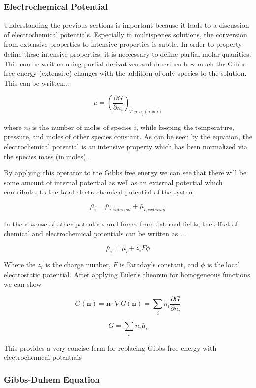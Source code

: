 \documentclass[lettersize,journal]{IEEEtran}
\begin{document}
 \subsubsection{Electrochemical Potential}

 Understanding the previous sections is important because it leads to a discussion of electrochemical potentials. Especially in multispecies solutions, the conversion from extensive properties to intensive properties is subtle. In order to property define these intensive properties, it is neccessary to define partial molar quanities. This can be written using partial derivatives and describes how much the Gibbs free energy (extensive) changes with the addition of only species to the solution. This can be written...

 \[
    \bar{\mu} = \left( \frac{\partial G}{\partial n_{i}} \right)_{T,p,n_{j} (j \neq i)}
 \]

 where $n_i$ is the number of moles of species $i$, while keeping the temperature, pressure, and moles of other species constant. As can be seen by the equation, the electrochemical potential is an intensive property which has been normalized via the species mass (in moles).

 By applying this operator to the Gibbs free energy we can see that there will be some amount of internal potential as well as an external potential which contributes to the total electrochemical potential of the system.

\[
    \bar{\mu_{i}} = \bar{\mu}_{i, internal} + \bar{\mu}_{i, external}
\]

 In the absense of other potentials and forces from external fields, the effect of chemical and electrochemical potentials can be written as ...

 \[
    \bar{\mu}_{i} = \mu_{i} + z_i F \phi
 \]


Where the $z_i$ is the charge number, $F$ is Faraday's constant, and $\phi$ is the local electrostatic potential. After applying Euler's theorem for homogeneous functions we can show

\[
    G(\textbf{n}) = \textbf{n} \cdot \nabla G (\textbf{n}) = \sum_i n_i \frac{\partial G}{\partial n_i}
\]

\[
    G = \sum_i n_i \bar{\mu}_i
\]

This provides a very concise form for replacing Gibbs free energy with electrochemical potentials

\subsubsection{Gibbs-Duhem Equation}
\end{document}
